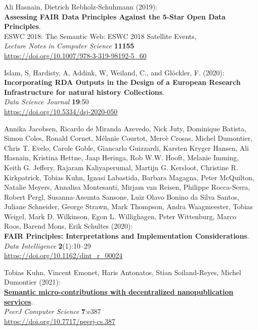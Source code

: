 \begin{thebibliography}{9}
Ali Hasnain, Dietrich Rebholz-Schuhmann (2019):\\
\textbf{Assessing FAIR Data Principles Against the 5-Star Open Data
Principles}.\\
ESWC 2018: The Semantic Web: ESWC 2018 Satellite Events,\\
\emph{Lecture Notes in Computer Science} \textbf{11155}\\
\url{https://doi.org/10.1007/978-3-319-98192-5_60}

Islam, S, Hardisty, A, Addink, W, Weiland, C., and Glöckler, F.
(2020):\\
\textbf{Incorporating RDA Outputs in the Design of a European Research Infrastructure for natural history Collections}.\\
\emph{Data Science Journal} \textbf{19}:50\\
\url{https://doi.org/10.5334/dsj-2020-050}

Annika Jacobsen, Ricardo de Miranda Azevedo, Nick
Juty, Dominique Batista, Simon Coles, Ronald Cornet, Mélanie Courtot,
Mercè Crosas, Michel Dumontier, Chris T. Evelo, Carole Goble, Giancarlo
Guizzardi, Karsten Kryger Hansen, Ali Hasnain, Kristina Hettne, Jaap
Heringa, Rob W.W. Hooft, Melanie Imming, Keith G. Jeffery, Rajaram
Kaliyaperumal, Martijn G. Kersloot, Christine R. Kirkpatrick, Tobias
Kuhn, Ignasi Labastida, Barbara Magagna, Peter McQuilton, Natalie
Meyers, Annalisa Montesanti, Mirjam van Reisen, Philippe Rocca-Serra,
Robert Pergl, Susanna-Assunta Sansone, Luiz Olavo Bonino da Silva
Santos, Juliane Schneider, George Strawn, Mark Thompson, Andra
Waagmeester, Tobias Weigel, Mark D. Wilkinson, Egon L. Willighagen,
Peter Wittenburg, Marco Roos, Barend Mons, Erik Schultes (2020):\\
\textbf{FAIR Principles: Interpretations and Implementation
Considerations}.\\
\emph{Data Intelligence} \textbf{2}(1):10--29\\
\url{https://doi.org/10.1162/dint_r_00024}

Tobias Kuhn, Vincent Emonet, Haris Antonatos, Stian
Soiland-Reyes, Michel Dumontier (2021):\\
\href{../../../2021/phd/nanopub/}{\textbf{Semantic micro-contributions
with decentralized nanopublication services}}.\\
\emph{PeerJ Computer Science} \textbf{7}:e387\\
\url{https://doi.org/10.7717/peerj-cs.387}


\end{thebibliography}
